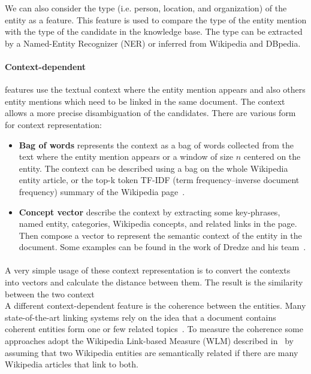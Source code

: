 We can also consider the type (i.e. person, location, and organization) of the entity as a feature. This feature is used to compare the type of the entity mention with the type of the candidate in the knowledge base. The type can be extracted by a Named-Entity Recognizer (NER) or inferred from Wikipedia and DBpedia.

\paragraph{Context-dependent} features use the textual context where the entity mention appears and also others entity mentions which need to be linked in the same document. The context allows a more precise disambiguation of the candidates. There are various form for context representation:

\begin{itemize}[topsep=10pt]
\item \textbf{Bag of words} represents the context as a bag of words collected from the text where the entity mention appears or a window of size $n$ centered on the entity. The context can be described using a bag on the whole Wikipedia entity article, or the top-k token TF-IDF (term frequency–inverse document frequency) summary of the Wikipedia page~\cite{ratinov2011local}.  
\pagebreak
\item \textbf{Concept vector} describe the context by extracting some key-phrases, named entity, categories, Wikipedia concepts, and related links in the page. Then compose a vector to represent the semantic context of the entity in the document. Some examples can be found in the work of Dredze and his team~\cite{dredze2010entity}.
\end{itemize}

\paragraph{} A very simple usage of these context representation is to convert the contexts into vectors and calculate the distance between them. The result is the similarity between the two context\\
\- \- \- A different context-dependent feature is the coherence between the entities. Many state-of-the-art linking systems rely on the idea that a document contains coherent entities form one or few related topics~\cite{hoffart2011robust}. To measure the coherence some approaches adopt the Wikipedia Link-based Measure (WLM) described in~\cite{milne2008learning} by assuming that two Wikipedia entities are semantically related if there are many Wikipedia articles that link to both.

